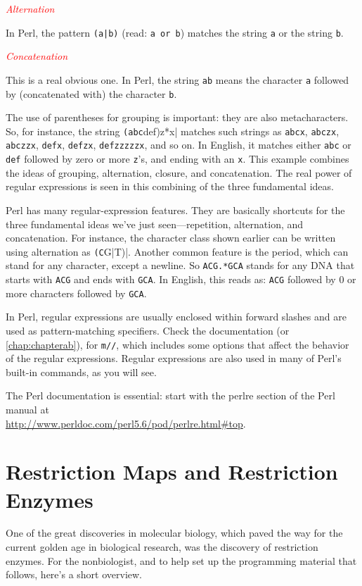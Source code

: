 \textcolor{red}{\textit{Alternation}}
\begin{adjustwidth}{1cm}{}
In Perl, the pattern \verb=(a|b)= (read: \verb|a or b|) matches the string \verb|a| or the string \verb|b|.
\end{adjustwidth}

\textcolor{red}{\textit{Concatenation}}
\begin{adjustwidth}{1cm}{}
This is a real obvious one. In Perl, the string \verb|ab| means the character \verb|a| followed by (concatenated with) the character \verb|b|.
\end{adjustwidth}

The use of parentheses for grouping is important: they are also metacharacters. So, for instance, the string \verb|(abc|def)z*x| matches such strings as \verb|abcx|, \verb|abczx|, \verb|abczzx|, \verb|defx|, \verb|defzx|, \verb|defzzzzzx|, and so on. In English, it matches either \verb|abc| or \verb|def| followed by zero or more \verb|z|'s, and ending with an \verb|x|. This example combines the ideas of grouping, alternation, closure, and concatenation. The real power of regular expressions is seen in this combining of the three fundamental ideas. 

Perl has many regular-expression features. They are basically shortcuts for the three fundamental ideas we've just seen—repetition, alternation, and concatenation. For instance, the character class shown earlier can be written using alternation as \verb|(C|G|T)|. Another common feature is the period, which can stand for any character, except a newline. So \verb|ACG.*GCA| stands for any DNA that starts with \verb|ACG| and ends with \verb|GCA|. In English, this reads as: \verb|ACG| followed by 0 or more characters followed by \verb|GCA|. 

In Perl, regular expressions are usually enclosed within forward slashes and are used as pattern-matching specifiers. Check the documentation (or \autoref{chap:chapterab}), for \verb|m//|, which includes some options that affect the behavior of the regular expressions. Regular expressions are also used in many of Perl's built-in commands, as you will see.

The Perl documentation is essential: start with the perlre section of the Perl manual at\\
\href{http://www.perldoc.com/perl5.6/pod/perlre.html\#top}{http://www.perldoc.com/perl5.6/pod/perlre.html\#top}. 

\section{Restriction Maps and Restriction Enzymes}
One of the great discoveries in molecular biology, which paved the way for the current golden age in biological research, was the discovery of restriction enzymes. For the nonbiologist, and to help set up the programming material that follows, here's a short overview. 

